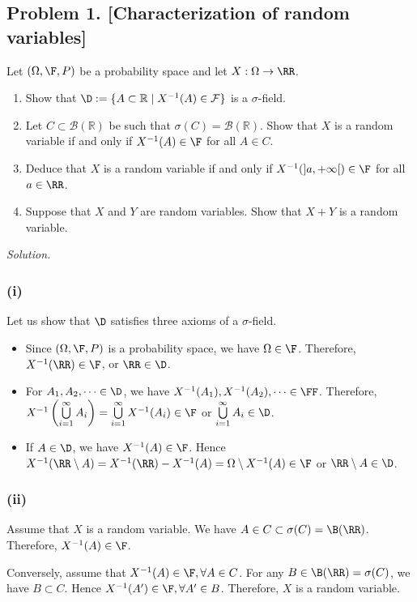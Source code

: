 \subsection*{Problem 1. [Characterization of random variables]} Let $(\Omega, \F, P)$ be a probability space and let
$X : \Omega \to\RR$.
\begin{enumerate}
    \item[(i)] Show that $\D := \{A\subset\mathbb{R}\mid X^{-1}(A) \in \mathcal{F}\}$ is a $\sigma$-field.
    \item[(ii)] Let $C\subset\mathcal{B}(\mathbb{R})$ be such that $\sigma(C) = \mathcal{B}(\mathbb{R})$. Show that $X$ is a random variable if and only if $X^{-1}(A)\in\F$ for all $A\in C$.
    \item[(iii)] Deduce that $X$ is a random variable if and only if $X^{-1}(]a, +\infty[) \in \F$ for all $a \in \RR$.
    \item[(iv)] Suppose that $X$ and $Y$ are random variables. Show that $X + Y$ is a random variable. 
\end{enumerate}

\textit{Solution.}

\subsubsection*{(i)} Let us show that $\D$ satisfies three axioms of a $\sigma$-field.
\begin{itemize}
    \item Since $(\Omega, \F, P)$ is a probability space, we have $\Omega\in\F$. Therefore, $X^{-1}(\RR)\in\F$, or $\RR\in\D$. 
    \item For $A_1,A_2,\cdots\in\D$, we have $X^{-1}(A_1), X^{-1}(A_2),\cdots\in\FF$. Therefore, $X^{-1}\left(\bigcup\limits_{i=1}^\infty A_i\right) = \bigcup\limits_{i=1}^\infty X^{-1}(A_i) \in\F$ or $\bigcup\limits_{i=1}^\infty A_i\in\D$.
    \item If $A\in\D$, we have $X^{-1}(A)\in\F$. Hence $X^{-1}(\RR\setminus A) = X^{-1}(\RR) - X^{-1}(A) = \Omega\setminus X^{-1}(A) \in \F$ or $\RR\setminus A\in\D$.
\end{itemize}

\subsubsection*{(ii)} Assume that $X$ is a random variable. We have $A\in C \subset \sigma(C) = \B(\RR)$. Therefore, $X^{-1}(A)\in\F$. 

Conversely, assume that $X^{-1}(A)\in\F,\forall A\in C$. For any $B\in\B(\RR)=\sigma(C)$, we have $B\subset C$. Hence $X^{-1}(A')\in\F, \forall A'\in B$. Therefore, $X$ is a random variable.

